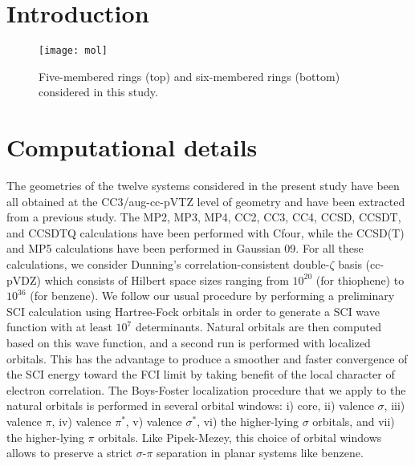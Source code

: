 \documentclass[aps,prb,reprint,noshowkeys,superscriptaddress]{revtex4-1}
\begin{document}
\section{Introduction}

\begin{figure*}
	\texttt{[image: mol]}
	\caption{
	Five-membered rings (top) and six-membered rings (bottom) considered in this study.
	\label{fig:mol}}
\end{figure*}

\section{Computational details}
The geometries of the twelve systems considered in the present study have been all obtained at the CC3/aug-cc-pVTZ level of geometry and have been extracted from a previous study. \cite{Loos_2020a}
The MP2, MP3, MP4, CC2, CC3, CC4, CCSD, CCSDT, and CCSDTQ calculations have been performed with Cfour, \cite{cfour} while the CCSD(T) and MP5 calculations have been performed in Gaussian 09. \cite{g09}
For all these calculations, we consider Dunning's correlation-consistent double-$\zeta$ basis (cc-pVDZ) which consists of Hilbert space sizes ranging from $10^{20}$ (for thiophene) to $10^{36}$ (for benzene).
We follow our usual procedure \cite{Scemama_2018,Scemama_2018b,Scemama_2019,Loos_2018a,Loos_2019,Loos_2020a,Loos_2020b,Loos_2020c} by performing a preliminary SCI calculation using Hartree-Fock orbitals in order to generate a SCI wave function with at least $10^7$ determinants.
Natural orbitals are then computed based on this wave function, and a second run is performed with localized orbitals.
This has the advantage to produce a smoother and faster convergence of the SCI energy toward the FCI limit by taking benefit of the local character of electron correlation.\cite{Angeli_2003,Angeli_2009,BenAmor_2011,Suaud_2017,Chien_2018,Eriksen_2020}
The Boys-Foster localization procedure \cite{Boys_1960} that we apply to the natural orbitals is performed in several orbital windows: i) core, ii) valence $\sigma$, iii) valence $\pi$, iv) valence $\pi^*$, v) valence $\sigma^*$, vi) the higher-lying $\sigma$ orbitals, and vii) the higher-lying $\pi$ orbitals. 
Like Pipek-Mezey, \cite{Pipek_1989} this choice of orbital windows allows to preserve a strict $\sigma$-$\pi$ separation in planar systems like benzene.
\end{document}
